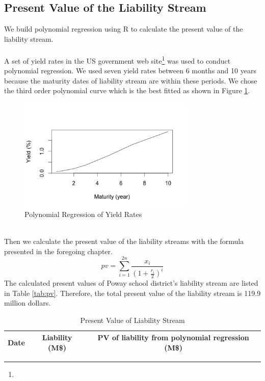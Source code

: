 \documentclass[oneside,12pt]{report}
\begin{document}
{\subsection{Present Value of the Liability Stream}
\vspace{8pt}
We build polynomial regression using R to calculate the present value of the liability stream.\\
\\
A set of yield rates in the US government web site\footnote{} was used to conduct polynomial regression. We used seven yield rates between 6 months and 10 years because the maturity dates of liability stream are within these periods. We chose the third order polynomial curve which is the best fitted as shown in Figure \ref{fig:yield}.
\begin{figure}[htb]
    \begin{center}
        \includegraphics[width=0.75\textwidth]{fit.png}
    \end{center}
    \caption{Polynomial Regression of Yield Rates}
\label{fig:yield}
\end{figure}
\\Then we calculate the present value of the liability streams with the formula presented in the foregoing chapter.
 $$ pv=\sum_{i=1}^{2n} \frac{x_i}{(1+\frac{r_i}{2})^i} $$ 
The calculated present values of Poway school district's liability stream are listed in Table \ref{tab:pv}. Therefore, the total present value of the liability stream is 119.9 million dollars.
\begin{table}[htbp]
  \centering
  \caption{Present Value of Liability Stream}
    \begin{tabular}{|c|c|c|}
\hline
    Date  & Liability (M\$) & PV of liability from polynomial regression (M\$) \\\hline

\end{tabular}
\end{table}}
\end{document}
